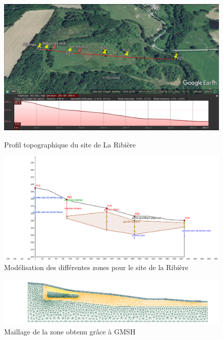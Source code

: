 \documentclass{article}
\begin{document}

\begin{figure}[H]
 \centering
        \includegraphics[width = \textwidth]{plan_coupe_google_earth.png} 
        \label{fig:earth_ribière}
        \caption{Profil topographique du site de La Ribière}
\end{figure}

\begin{figure}[H]
    \centering
    \includegraphics[width=0.8\linewidth]{III_B_3_3.png}
    \caption{Modélisation  des différentes zones pour le site de la Ribière}
    \label{fig:zones_ribieres_geogebra}
\end{figure}

\begin{figure}[H]
    \centering
    \includegraphics[width=1.0\linewidth]{III_B_3_4.png}
    \caption{Maillage de la zone obtenu grâce à GMSH}
    \label{maillage_ribiere}
\end{figure}     
\end{document}
